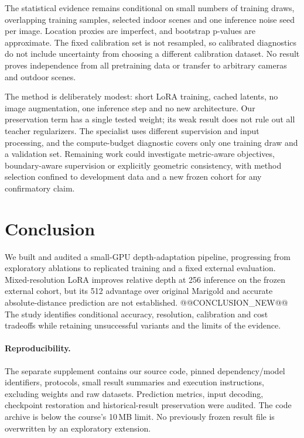 \documentclass[10pt,twocolumn,letterpaper]{article}
\begin{document}
The statistical evidence remains conditional on small numbers of training draws, overlapping training samples, selected indoor scenes and one inference noise seed per image. Location proxies are imperfect, and bootstrap p-values are approximate. The fixed calibration set is not resampled, so calibrated diagnostics do not include uncertainty from choosing a different calibration dataset. No result proves independence from all pretraining data or transfer to arbitrary cameras and outdoor scenes.

The method is deliberately modest: short LoRA training, cached latents, no image augmentation, one inference step and no new architecture. Our preservation term has a single tested weight; its weak result does not rule out all teacher regularizers. The specialist uses different supervision and input processing, and the compute-budget diagnostic covers only one training draw and a validation set. Remaining work could investigate metric-aware objectives, boundary-aware supervision or explicitly geometric consistency, with method selection confined to development data and a new frozen cohort for any confirmatory claim.

\section{Conclusion}
We built and audited a small-GPU depth-adaptation pipeline, progressing from exploratory ablations to replicated training and a fixed external evaluation. Mixed-resolution LoRA improves relative depth at 256 inference on the frozen external cohort, but its 512 advantage over original Marigold and accurate absolute-distance prediction are not established. @@CONCLUSION_NEW@@ The study identifies conditional accuracy, resolution, calibration and cost tradeoffs while retaining unsuccessful variants and the limits of the evidence.

\paragraph{Reproducibility.}
The separate supplement contains our source code, pinned dependency/model identifiers, protocols, small result summaries and execution instructions, excluding weights and raw datasets. Prediction metrics, input decoding, checkpoint restoration and historical-result preservation were audited. The code archive is below the course's 10\,MB limit. No previously frozen result file is overwritten by an exploratory extension.
\end{document}
